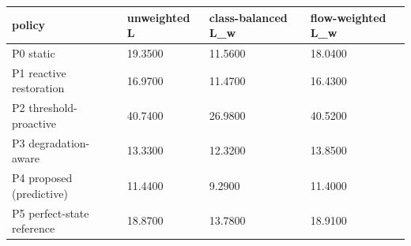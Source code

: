 \begin{tabular}{llll}
\toprule
policy & unweighted L & class-balanced L\_w & flow-weighted L\_w \\
\midrule
P0 static & 19.3500 & 11.5600 & 18.0400 \\
P1 reactive restoration & 16.9700 & 11.4700 & 16.4300 \\
P2 threshold-proactive & 40.7400 & 26.9800 & 40.5200 \\
P3 degradation-aware & 13.3300 & 12.3200 & 13.8500 \\
P4 proposed (predictive) & 11.4400 & 9.2900 & 11.4000 \\
P5 perfect-state reference & 18.8700 & 13.7800 & 18.9100 \\
\bottomrule
\end{tabular}
